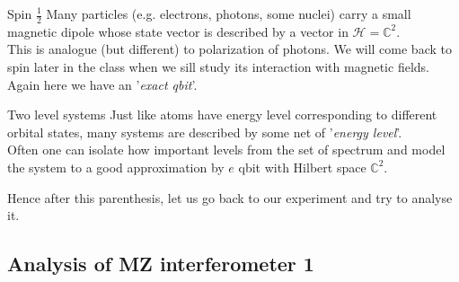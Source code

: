 \begin{parag}{Spin $\frac{1}{2}$}
    Many particles (e.g. electrons, photons, some nuclei) carry a small magnetic dipole whose state vector is described by a vector in $\mathcal{H} = \mathbb{C}^2$. \\
	This is analogue (but different) to polarization of photons. We will come back to spin later in the class when we sill study its interaction with magnetic fields. Again here we have an '\textit{exact qbit}'.
\end{parag}
\begin{parag}{Two level systems}
Just like atoms have energy level corresponding to different orbital states, many systems are described by some net of '\textit{energy level}'.\\
Often one can isolate how important levels from the set of spectrum and model the system to a good approximation by $e$ qbit with Hilbert space $\mathbb{C}^2$.
\end{parag}
Hence after this parenthesis, let us go back to our experiment and try to analyse it.

\subsection{Analysis of MZ interferometer 1}

